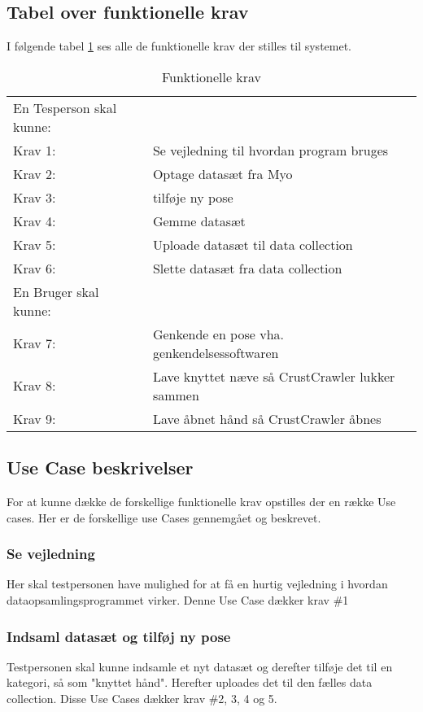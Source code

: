 \subsection{Tabel over funktionelle krav}
I følgende tabel \ref{tab:funktionellekrav} ses alle de funktionelle krav der stilles til systemet.
\bgroup
\def\arraystretch{1.8}
\begin{center}
	\begin{table}
		\begin{tabular}{lp{225pt}}
			\rowcolor{grey} En Tesperson skal kunne: &\\
			Krav 1:& Se vejledning til hvordan program bruges\\
			Krav 2:& Optage datasæt fra Myo\\
			Krav 3:& tilføje ny pose\\
			Krav 4:& Gemme datasæt\\
			Krav 5:& Uploade datasæt til data collection\\
			Krav 6:& Slette datasæt fra data collection\\
			\rowcolor{grey}En Bruger skal kunne: &\\
			Krav 7:& Genkende en pose vha. genkendelsessoftwaren\\
			Krav 8:& Lave knyttet næve så CrustCrawler lukker sammen\\
			Krav 9:& Lave åbnet hånd så CrustCrawler åbnes
		\end{tabular}
		\caption{Funktionelle krav}
		\label{tab:funktionellekrav}
	\end{table}	
\end{center}
\egroup

\subsection{Use Case beskrivelser}
For at kunne dække de forskellige funktionelle krav opstilles der en række Use cases. Her er de forskellige use Cases gennemgået og beskrevet.

\subsubsection{Se vejledning}
Her skal testpersonen have mulighed for at få en hurtig vejledning i hvordan dataopsamlingsprogrammet virker. Denne Use Case dækker krav \#1

\subsubsection{Indsaml datasæt og tilføj ny pose}
Testpersonen skal kunne indsamle et nyt datasæt og derefter tilføje det til en kategori, så som "knyttet hånd". Herefter uploades det til den fælles data collection. Disse Use Cases dækker krav \#2, 3, 4 og 5.

